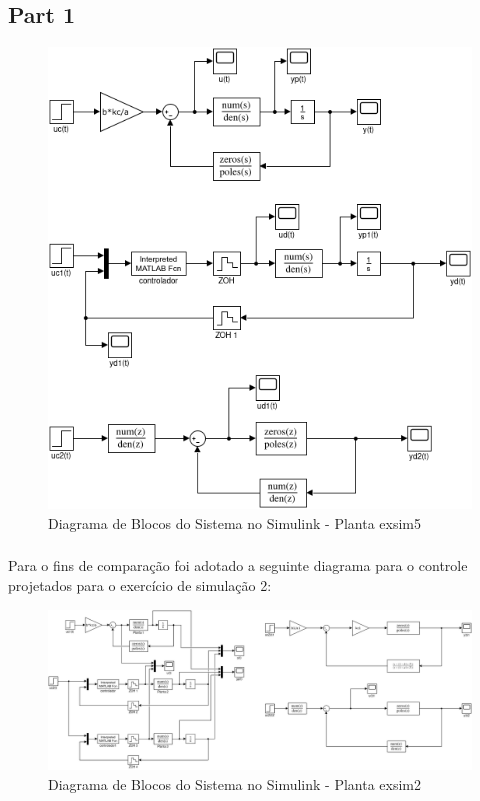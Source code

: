 \documentclass[a4paper,11pt]{article}
\begin{document}
\subsection{Part 1}

\begin{figure}[H]
    \centering
    \includegraphics[width=0.9\linewidth]{img/exsim5model.png}
    \caption{Diagrama de Blocos do Sistema no Simulink - Planta exsim5}
\end{figure}


\subsubsection{}

Para o fins de comparação foi adotado a seguinte diagrama para o controle projetados para o exercício de simulação 2:

\begin{figure}[H]
    \centering
    \includegraphics[width=1\linewidth]{img/exsim2model.png}
    \caption{Diagrama de Blocos do Sistema no Simulink - Planta exsim2}
\end{figure}
\end{document}
